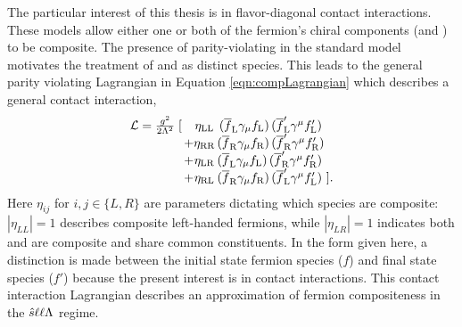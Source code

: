 The particular interest of this thesis is in flavor-diagonal contact interactions.
These models allow either one or both of the fermion's chiral components (\fl and \fr) to be composite.
The presence of parity-violating in the standard model motivates the treatment of \fl and \fr as distinct species.
This leads to the general parity violating Lagrangian in Equation \ref{eqn:compLagrangian} which describes a general contact interaction,
\begin{equation}\label{eqn:compLagrangian}
\begin{array}{r@{\,}c@{}c@{\,}l@{\,}l}
\mathcal L = \frac{g^2}{2\Lambda^2}\;[ && \eta_{\mathrm{LL}}&\, (\ufl\gamma_{\mu} \fl)\,(\uflp\gamma^{\mu}\flp) \nonumber \\
& +&\eta_{\mathrm{RR}}& (\ufr\gamma_{\mu} \fr) \,(\ufrp\gamma^{\mu}\frp) \\
&+&\eta_{\mathrm{LR}}& (\ufl\gamma_{\mu} \fl) \,(\ufrp\gamma^{\mu}\frp) \\
&+&\eta_{\mathrm{RL}}& (\ufr\gamma_{\mu} \fr) \,(\uflp\gamma^{\mu}\flp)& ] .\nonumber
\end{array}
\end{equation}
Here $\eta_{ij}$ for $i,j\in\{L,R\}$ are parameters dictating which species are composite: $|\eta_{LL}|=1$ describes composite left-handed fermions, while $|\eta_{LR}|=1$ indicates both \fr and \fl are composite and share common constituents.
In the form given here, a distinction is made between the initial state fermion species ($f$) and final state species ($f'$) because the present interest is in \llqq contact interactions.
This contact interaction Lagrangian describes an approximation of fermion compositeness in the $\shat\llt\lam$ regime.

